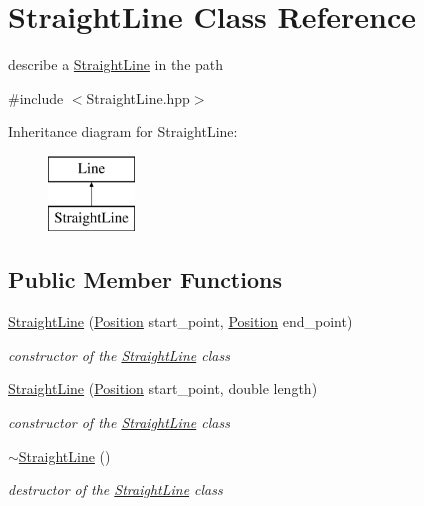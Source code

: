\hypertarget{class_straight_line}{}\section{Straight\+Line Class Reference}
\label{class_straight_line}


describe a \mbox{\hyperlink{class_straight_line}{Straight\+Line}} in the path  




{\ttfamily \#include $<$Straight\+Line.\+hpp$>$}

Inheritance diagram for Straight\+Line\+:\begin{figure}[H]
\begin{center}
\leavevmode
\includegraphics[height=2.000000cm]{class_straight_line}
\end{center}
\end{figure}
\subsection*{Public Member Functions}
\begin{DoxyCompactItemize}
\item 
\mbox{\hyperlink{class_straight_line_a583064766a4c73bfa58ee1cb9f5b4495}{Straight\+Line}} (\mbox{\hyperlink{class_position}{Position}} start\+\_\+point, \mbox{\hyperlink{class_position}{Position}} end\+\_\+point)
\begin{DoxyCompactList}\small\item\em constructor of the \mbox{\hyperlink{class_straight_line}{Straight\+Line}} class \end{DoxyCompactList}\item 
\mbox{\hyperlink{class_straight_line_ac55a20f7c9d8ba62f4dd0bba0e9d8c4e}{Straight\+Line}} (\mbox{\hyperlink{class_position}{Position}} start\+\_\+point, double length)
\begin{DoxyCompactList}\small\item\em constructor of the \mbox{\hyperlink{class_straight_line}{Straight\+Line}} class \end{DoxyCompactList}\item 
\mbox{\label{class_straight_line_a24fc4b7e915d5a42b40f716e49558663}} 
\mbox{\hyperlink{class_straight_line_a24fc4b7e915d5a42b40f716e49558663}{$\sim$\+Straight\+Line}} ()
\begin{DoxyCompactList}\small\item\em destructor of the \mbox{\hyperlink{class_straight_line}{Straight\+Line}} class \end{DoxyCompactList}\end{DoxyCompactItemize}


